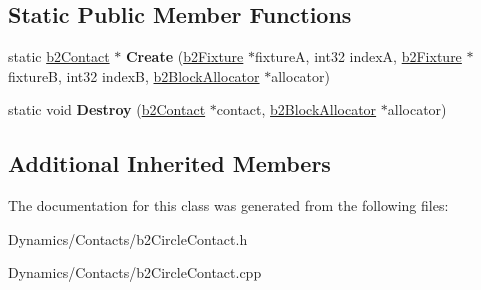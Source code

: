 \subsection*{Static Public Member Functions}
\begin{DoxyCompactItemize}
\item 
\mbox{\label{classb2CircleContact_ab0ea452487cb19217ae8480dbc22fd41}} 
static \mbox{\hyperlink{classb2Contact}{b2\+Contact}} $\ast$ {\bfseries Create} (\mbox{\hyperlink{classb2Fixture}{b2\+Fixture}} $\ast$fixtureA, int32 indexA, \mbox{\hyperlink{classb2Fixture}{b2\+Fixture}} $\ast$fixtureB, int32 indexB, \mbox{\hyperlink{classb2BlockAllocator}{b2\+Block\+Allocator}} $\ast$allocator)
\item 
\mbox{\label{classb2CircleContact_a4ca67c653a18d88180e49149f0df742a}} 
static void {\bfseries Destroy} (\mbox{\hyperlink{classb2Contact}{b2\+Contact}} $\ast$contact, \mbox{\hyperlink{classb2BlockAllocator}{b2\+Block\+Allocator}} $\ast$allocator)
\end{DoxyCompactItemize}
\subsection*{Additional Inherited Members}


The documentation for this class was generated from the following files\+:\begin{DoxyCompactItemize}
\item 
Dynamics/\+Contacts/b2\+Circle\+Contact.\+h\item 
Dynamics/\+Contacts/b2\+Circle\+Contact.\+cpp\end{DoxyCompactItemize}
